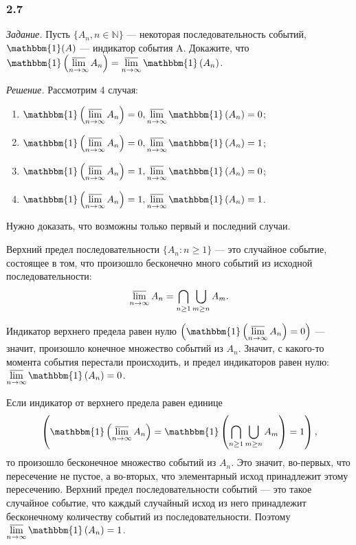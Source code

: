 \documentclass{book}
\begin{document}
\subsubsection*{2.7}

\textit{Задание.} Пусть $\{A_n, n\in\mathbb{N}\}$ --- некоторая последовательность событий, $\mathbbm{1}(A)$ --- индикатор события A. Докажите, что $\mathbbm{1}\left(\varlimsup\limits_{n\to\infty}A_n\right)=\varlimsup\limits_{n\to\infty}\mathbbm{1}\left(A_n\right)$.

\textit{Решение.} Рассмотрим 4 случая: 

\begin{enumerate}
\item $\mathbbm{1}\left(\varlimsup\limits_{n\to\infty}A_n\right)=0, \varlimsup\limits_{n\to\infty}\mathbbm{1}\left(A_n\right)=0$;
\item $\mathbbm{1}\left(\varlimsup\limits_{n\to\infty}A_n\right)=0, \varlimsup\limits_{n\to\infty}\mathbbm{1}\left(A_n\right)=1$;
\item $\mathbbm{1}\left(\varlimsup\limits_{n\to\infty}A_n\right)=1, \varlimsup\limits_{n\to\infty}\mathbbm{1}\left(A_n\right)=0$;
\item $\mathbbm{1}\left(\varlimsup\limits_{n\to\infty}A_n\right)=1, \varlimsup\limits_{n\to\infty}\mathbbm{1}\left(A_n\right)=1$.
\end{enumerate}

Нужно доказать, что возможны только первый и последний случаи.

Верхний предел последовательности $\{A_n: n\geq 1\}$ --- это случайное событие, состоящее в том, что произошло бесконечно много событий из исходной последовательности: $$\varlimsup\limits_{n\to\infty}A_n=\bigcap\limits_{n\geq 1}\bigcup\limits_{m\geq n}A_m.$$


Индикатор верхнего предела равен нулю $\left(\mathbbm{1}\left(\varlimsup\limits_{n\to\infty}A_n\right)=0\right)$ --- значит, произошло конечное множество событий из $A_n$. Значит, с какого-то момента события перестали происходить, и предел индикаторов равен нулю: $\varlimsup\limits_{n\to\infty}\mathbbm{1}\left(A_n\right)=0$.

Если индикатор от верхнего предела равен единице $$\left(\mathbbm{1}\left(\varlimsup\limits_{n\to\infty}A_n\right)=\mathbbm{1}\left(\bigcap\limits_{n\geq 1}\bigcup\limits_{m\geq n}A_m\right)=1\right),$$ то произошло бесконечное множество событий из $A_n$. Это значит, во-первых, что пересечение не пустое, а во-вторых, что элементарный исход принадлежит этому пересечению. Верхний предел последовательности событий --- это такое случайное событие, что каждый случайный исход из него принадлежит бесконечному количеству событий из последовательности. Поэтому $\varlimsup\limits_{n\to\infty}\mathbbm{1}\left(A_n\right)=1$.
\end{document}

